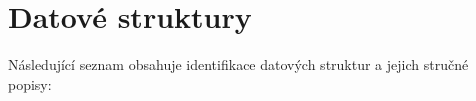 \section{Datové struktury}
Následující seznam obsahuje identifikace datových struktur a jejich stručné popisy:\begin{DoxyCompactList}
\item{}
\end{DoxyCompactList}
